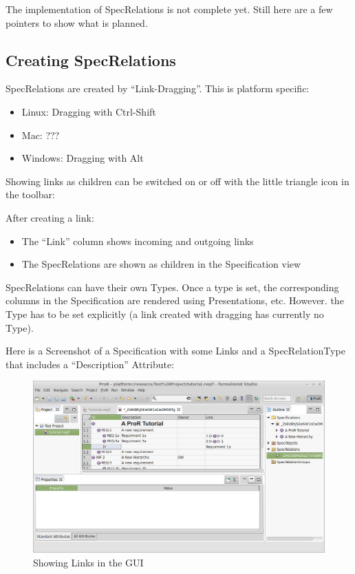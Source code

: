 The implementation of SpecRelations is not complete yet.  Still here are a few pointers to show what is planned.

\subsection{Creating SpecRelations}

SpecRelations are created by ``Link-Dragging''.  This is platform specific:

\begin{itemize}

\item
  Linux: Dragging with Ctrl-Shift
\item
  Mac: ???
\item
  Windows: Dragging with Alt
\end{itemize}

Showing links as children can be switched on or off with the little triangle icon in the toolbar:

After creating a link:

\begin{itemize}
\item
  The ``Link'' column shows incoming and outgoing links
\item
  The SpecRelations are shown as children in the Specification view
\end{itemize}

SpecRelations can have their own Types.  Once a type is set, the corresponding columns in the Specification are rendered using Presentations, etc.  However.  the Type has to be set explicitly (a link created with dragging has currently no Type).

Here is a Screenshot of a Specification with some Links and a SpecRelationType that includes a ``Description'' Attribute:

\begin{figure}[h!]      
\centering      
\includegraphics[width=\linewidth]{../rmf-images/links.png}      
\caption{Showing Links in the GUI}      
\label{fig:linksInGui}
\end{figure}

